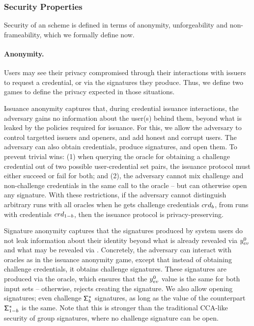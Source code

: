 \subsubsection{Security Properties}
\label{sssec:security}
%
Security of an \UAS scheme is defined in terms of anonymity, unforgeability and
non-frameability, which we formally define now.

\paragraph{Anonymity.} %
Users may see their privacy compromised through their interactions with issuers
to request a credential, or via the signatures they produce. Thus, we define two
games to define the privacy expected in those situations.

Issuance anonymity captures that, during credential issuance
interactions, the adversary gains no information about the user(s) behind them,
beyond what is leaked by the policies required for issuance. For this, we allow
the adversary to control targetted issuers and openers, and add honest and
corrupt users. The adversary can also obtain credentials, produce signatures,
and open them. To prevent trivial wins: (1) when querying the oracle for
obtaining a challenge credential out of two possible user-credential set pairs,
the issuance protocol must either succeed or fail for both; and (2), the
adversary cannot mix challenge and non-challenge credentials in the same call to
the \SIGN oracle -- but can otherwise open any signature. With these
restrictions, if the adversary cannot distinguish arbitrary runs with all
oracles when he gets challenge credentials $crd_b$, from runs with credentials
$crd_{1-b}$, then the issuance protocol is privacy-preserving.

Signature anonymity captures that the signatures produced by system users do not
leak information about their identity beyond what is already revealed via
$y_{ev}^0$ and what may be revealed via \yinsp. Concretely, the adversary can
interact with oracles as in the issuance anonymity game, except that instead of
obtaining challenge credentials, it obtains challenge signatures. These
signatures are produced via the \CHALb oracle, which ensures that the $y_{ev}^0$
value is the same for both input sets -- otherwise, rejects creating the
signature. We also allow opening signatures; even challenge $\mathsf{\Sigma}^*_b$
signatures, as long as the \yinsp value of the counterpart $\mathsf{\Sigma}^*_{1-b}$ is the
same. Note that this is stronger than the traditional CCA-like security of group
signatures, where no challenge signature can be open.

